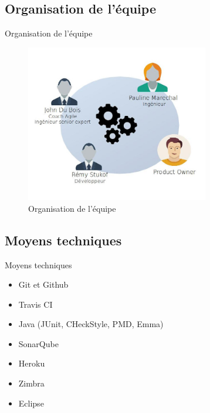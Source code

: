 \subsection{Organisation de l'équipe}
\begin{frame}{Organisation de l'équipe}
		\begin{figure}[H]
			\includegraphics[width=8cm]{team.jpg}
			\caption{Organisation de l'équipe}
		\end{figure}
\end{frame}
\subsection{Moyens techniques}
\begin{frame}{Moyens techniques}
	\begin{itemize}
		\item Git et Github
		\item Travis CI
		\item Java (JUnit, CHeckStyle, PMD, Emma)
		\item SonarQube
		\item Heroku
		\item Zimbra
		\item Eclipse
	\end{itemize}
\end{frame}